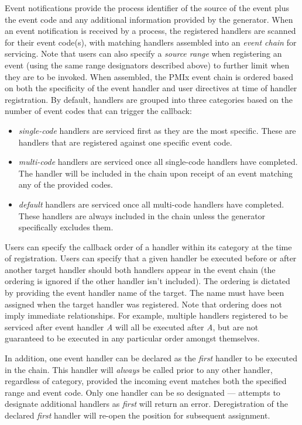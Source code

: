 Event notifications provide the process identifier of the source of the event plus the event code and any additional information provided by the generator. When an event notification is received by a process, the registered handlers are scanned for their event code(s), with matching handlers assembled into an \textit{event chain} for servicing. Note that users can also specify a \textit{source range} when registering an event (using the same range designators described above) to further limit when they are to be invoked. When assembled, the PMIx event chain is ordered based on both the specificity of the event handler and user directives at time of handler registration. By default, handlers are grouped into three categories based on the number of event codes that can trigger the callback:
\begin{itemize}
%
\item \textit{single-code} handlers are serviced first as they are the most specific. These are handlers that are registered against one specific event code.
%
\item \textit{multi-code} handlers are serviced once all single-code handlers have completed. The handler will be included in the chain upon receipt of an event matching any of the provided codes.
%
\item \textit{default} handlers are serviced once all multi-code handlers have completed. These handlers are always included in the chain unless the generator specifically excludes them.
%
\end{itemize}

Users can specify the callback order of a handler within its category at the time of registration.
Users can specify that a given handler be executed before or after another target handler should both handlers appear in the event chain (the ordering is ignored if the other handler isn't included).
The ordering is dictated by providing the event handler name of the target.  The name must have been assigned when the target handler was registered.
Note that ordering does not imply immediate relationships. For example, multiple handlers registered to be serviced after event handler \textit{A} will all be executed after \textit{A}, but are not guaranteed to be executed in any particular order amongst themselves.

In addition, one event handler can be declared as the \textit{first} handler to be executed in the chain. This handler will \textit{always} be called prior to any other handler, regardless of category, provided the incoming event matches both the specified range and event code. Only one handler can be so designated --- attempts to designate additional handlers as \textit{first} will return an error. Deregistration of the declared \textit{first} handler will re-open the position for subsequent assignment.

